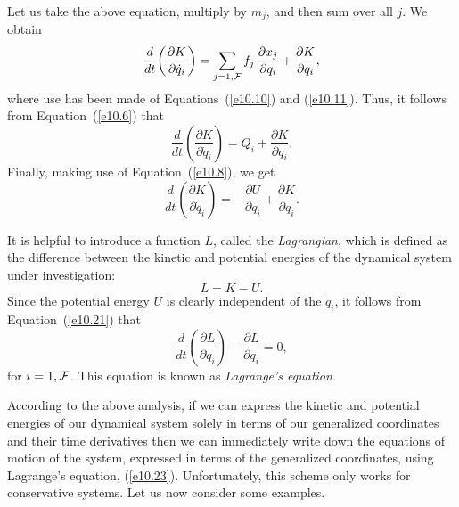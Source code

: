 Let us take the above equation, multiply by $m_j$, and then sum over all $j$. 
We obtain
\begin{equation}
\frac{d}{dt}\!\left(\frac{\partial K}{\partial \dot{q}_i}\right) = \sum_{j=1,{\cal F}}
f_j\,\frac{\partial x_j}{\partial q_i} + \frac{\partial K}{\partial q_i},
\end{equation}
where use has been made of Equations~(\ref{e10.10}) and (\ref{e10.11}). Thus, it follows from Equation~(\ref{e10.6}) that
\begin{equation}
\frac{d}{dt}\!\left(\frac{\partial K}{\partial \dot{q}_i}\right) = Q_i + \frac{\partial K}{\partial q_i}.
\end{equation}
Finally, making use of Equation~(\ref{e10.8}), we get
\begin{equation}\label{e10.21}
\frac{d}{dt}\!\left(\frac{\partial K}{\partial \dot{q}_i}\right) = -\frac{\partial U}{\partial q_i}+\frac{\partial K}{\partial q_i}.
\end{equation}

It is helpful to introduce a function $L$, called the {\em Lagrangian}, which
is defined as the difference between the kinetic and potential energies of the dynamical system under investigation:
\begin{equation}\label{e10.21a}
L = K - U.
\end{equation}
Since the potential energy $U$ is clearly  independent of the
$\dot{q}_i$, it follows from Equation~(\ref{e10.21}) that
\begin{equation}\label{e10.23}
\frac{d}{dt}\!\left(\frac{\partial L}{\partial \dot{q}_i}\right)  -\frac{\partial L}{\partial q_i} =0,
\end{equation}
for $i=1,{\cal F}$. This equation is known as {\em Lagrange's equation}.

According to the above analysis, if we can express the kinetic and
potential energies of our dynamical system solely in terms of our generalized
coordinates and their time derivatives then we can immediately write
down the equations of motion of the system, expressed in terms
of the generalized coordinates, using Lagrange's equation, (\ref{e10.23}).
Unfortunately, this scheme only works for conservative systems.
Let us now consider some examples. 

